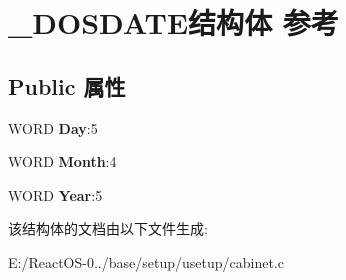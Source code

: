 \hypertarget{struct___d_o_s_d_a_t_e}{}\section{\+\_\+\+D\+O\+S\+D\+A\+T\+E结构体 参考}
\label{struct___d_o_s_d_a_t_e}
\subsection*{Public 属性}
\begin{DoxyCompactItemize}
\item 
\mbox{\label{struct___d_o_s_d_a_t_e_a1afba8235312030193685781280ee16b}} 
W\+O\+RD {\bfseries Day}\+:5
\item 
\mbox{\label{struct___d_o_s_d_a_t_e_a0bce40f931c37d1ce27d9f0855bc958b}} 
W\+O\+RD {\bfseries Month}\+:4
\item 
\mbox{\label{struct___d_o_s_d_a_t_e_a182038e688ea902457d3483bd7204074}} 
W\+O\+RD {\bfseries Year}\+:5
\end{DoxyCompactItemize}


该结构体的文档由以下文件生成\+:\begin{DoxyCompactItemize}
\item 
E\+:/\+React\+O\+S-\/0../base/setup/usetup/cabinet.\+c\end{DoxyCompactItemize}
